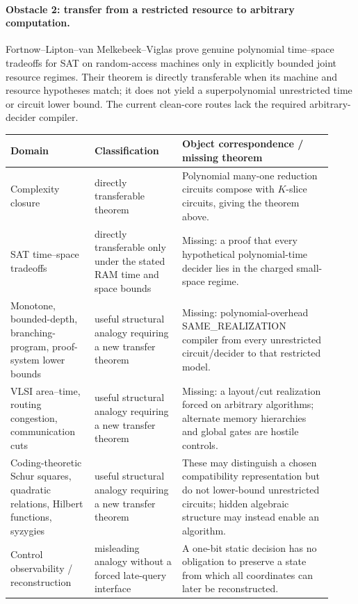 \documentclass[11pt]{article}
\begin{document}
\paragraph{Obstacle 2: transfer from a restricted resource to arbitrary computation.}
Fortnow--Lipton--van Melkebeek--Viglas prove genuine polynomial time--space tradeoffs for SAT on random-access machines only in explicitly bounded joint resource regimes.  Their theorem is directly transferable when its machine and resource hypotheses match; it does not yield a superpolynomial unrestricted time or circuit lower bound.  The current clean-core routes lack the required arbitrary-decider compiler.

\begin{longtable}{p{0.24\linewidth}p{0.25\linewidth}p{0.43\linewidth}}
\toprule
\textbf{Domain} & \textbf{Classification} & \textbf{Object correspondence / missing theorem}\\
\midrule
Complexity closure & directly transferable theorem & Polynomial many-one reduction circuits compose with \(K\)-slice circuits, giving the theorem above.\\
SAT time--space tradeoffs & directly transferable only under the stated RAM time and space bounds & Missing: a proof that every hypothetical polynomial-time decider lies in the charged small-space regime.\\
Monotone, bounded-depth, branching-program, proof-system lower bounds & useful structural analogy requiring a new transfer theorem & Missing: polynomial-overhead SAME\_REALIZATION compiler from every unrestricted circuit/decider to that restricted model.\\
VLSI area--time, routing congestion, communication cuts & useful structural analogy requiring a new transfer theorem & Missing: a layout/cut realization forced on arbitrary algorithms; alternate memory hierarchies and global gates are hostile controls.\\
Coding-theoretic Schur squares, quadratic relations, Hilbert functions, syzygies & useful structural analogy requiring a new transfer theorem & These may distinguish a chosen compatibility representation but do not lower-bound unrestricted circuits; hidden algebraic structure may instead enable an algorithm.\\
Control observability / reconstruction & misleading analogy without a forced late-query interface & A one-bit static decision has no obligation to preserve a state from which all coordinates can later be reconstructed.\\
\bottomrule
\end{longtable}
\end{document}
